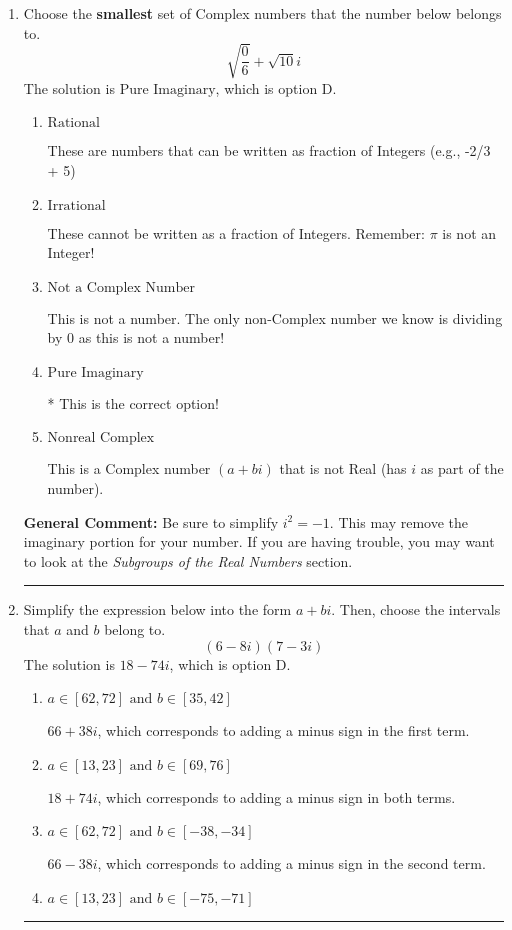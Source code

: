\documentclass{extbook}[14pt]
\newcommand{\litem}[1]{\item #1

\rule{\textwidth}{0.4pt}}
\begin{document}
\begin{enumerate}\litem{
Choose the \textbf{smallest} set of Complex numbers that the number below belongs to.
\[ \sqrt{\frac{0}{6}}+\sqrt{10}i \]The solution is \( \text{Pure Imaginary} \), which is option D.\begin{enumerate}[label=\Alph*.]
\item \( \text{Rational} \)

These are numbers that can be written as fraction of Integers (e.g., -2/3 + 5)
\item \( \text{Irrational} \)

These cannot be written as a fraction of Integers. Remember: $\pi$ is not an Integer!
\item \( \text{Not a Complex Number} \)

This is not a number. The only non-Complex number we know is dividing by 0 as this is not a number!
\item \( \text{Pure Imaginary} \)

* This is the correct option!
\item \( \text{Nonreal Complex} \)

This is a Complex number $(a+bi)$ that is not Real (has $i$ as part of the number).
\end{enumerate}

\textbf{General Comment:} Be sure to simplify $i^2 = -1$. This may remove the imaginary portion for your number. If you are having trouble, you may want to look at the \textit{Subgroups of the Real Numbers} section.
}
\litem{
Simplify the expression below into the form $a+bi$. Then, choose the intervals that $a$ and $b$ belong to.
\[ (6 - 8 i)(7 - 3 i) \]The solution is \( 18 - 74 i \), which is option D.\begin{enumerate}[label=\Alph*.]
\item \( a \in [62, 72] \text{ and } b \in [35, 42] \)

 $66 + 38 i$, which corresponds to adding a minus sign in the first term.
\item \( a \in [13, 23] \text{ and } b \in [69, 76] \)

 $18 + 74 i$, which corresponds to adding a minus sign in both terms.
\item \( a \in [62, 72] \text{ and } b \in [-38, -34] \)

 $66 - 38 i$, which corresponds to adding a minus sign in the second term.
\item \( a \in [13, 23] \text{ and } b \in [-75, -71] \)


\end{enumerate}}
\end{enumerate}
\end{document}
